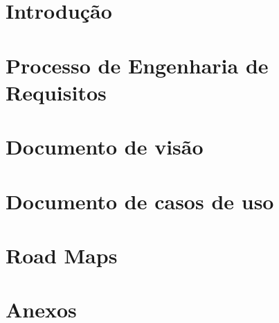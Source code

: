 
\section{Introdução} %
\label{sec:introdu_o}
 
\section{Processo de Engenharia de Requisitos}
\label{sec:processo}


% 

\section{Documento de visão}
\label{sec:document_de_visao}


\section{Documento de casos de uso}
\label{sec:documento_de_caso_de_uso}


\section{Road Maps}
\label{sec:road_map}


\section{Anexos}
\label{sec:anexos}


%

%
